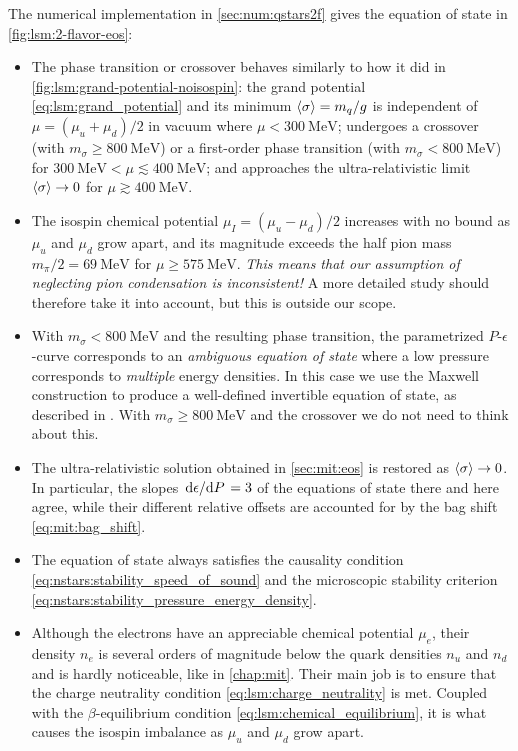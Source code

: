 \pagebreak
The numerical implementation in \cref{sec:num:qstars2f}
gives the equation of state in \cref{fig:lsm:2-flavor-eos}:
\begin{itemize}
\item The phase transition or crossover behaves similarly to how it did in \cref{fig:lsm:grand-potential-noisospin}:
      the grand potential \eqref{eq:lsm:grand_potential} and its minimum $\langle \sigma \rangle=m_q/g$ is independent of $\mu=(\mu_u+\mu_d)/2$ in vacuum where $\mu < \SI{300}{\mega\electronvolt}$;
      undergoes a crossover (with $m_\sigma \geq \SI{800}{\mega\electronvolt}$) or a first-order phase transition (with $m_\sigma < \SI{800}{\mega\electronvolt}$) for $\SI{300}{\mega\electronvolt} < \mu \lesssim \SI{400}{\mega\electronvolt}$;
      and approaches the ultra-relativistic limit $\langle \sigma \rangle\rightarrow 0$ for $\mu \gtrsim \SI{400}{\mega\electronvolt}$.
\item The isospin chemical potential $\mu_I=(\mu_u-\mu_d)/2$ increases with no bound as $\mu_u$ and $\mu_d$ grow apart,
      and its magnitude exceeds the half pion mass $m_\pi/2 = \SI{69}{\mega\electronvolt}$ for $\mu \geq \SI{575}{\mega\electronvolt}$.
      \emph{This means that our assumption of neglecting pion condensation is inconsistent!}
      A more detailed study should therefore take it into account, but this is outside our scope.
\item With $m_\sigma < \SI{800}{\mega\electronvolt}$ and the resulting phase transition,
      the parametrized $P$-$\epsilon$-curve corresponds to an \emph{ambiguous equation of state}
      where a low pressure corresponds to \emph{multiple} energy densities.
      In this case we use the Maxwell construction to produce a well-defined invertible equation of state,
      as described in \cite[equation (4.69)]{ref:master_francesco}.
      With $m_\sigma \geq \SI{800}{\mega\electronvolt}$ and the crossover we do not need to think about this.
\item The ultra-relativistic solution obtained in \cref{sec:mit:eos} is restored as $\langle \sigma \rangle \rightarrow 0$.
      In particular, the slopes $\odv{\epsilon}/{P} = 3$ of the equations of state there and here agree,
      while their different relative offsets are accounted for by the bag shift \eqref{eq:mit:bag_shift}.
\item The equation of state always satisfies the causality condition \eqref{eq:nstars:stability_speed_of_sound}
      and the microscopic stability criterion \eqref{eq:nstars:stability_pressure_energy_density}.
\item Although the electrons have an appreciable chemical potential $\mu_e$,
      their density $n_e$ is several orders of magnitude below the quark densities $n_u$ and $n_d$ and is hardly noticeable,
      like in \cref{chap:mit}.
      Their main job is to ensure that the charge neutrality condition \eqref{eq:lsm:charge_neutrality} is met.
      Coupled with the $\beta$-equilibrium condition \eqref{eq:lsm:chemical_equilibrium},
      it is what causes the isospin imbalance as $\mu_u$ and $\mu_d$ grow apart.
\end{itemize}

